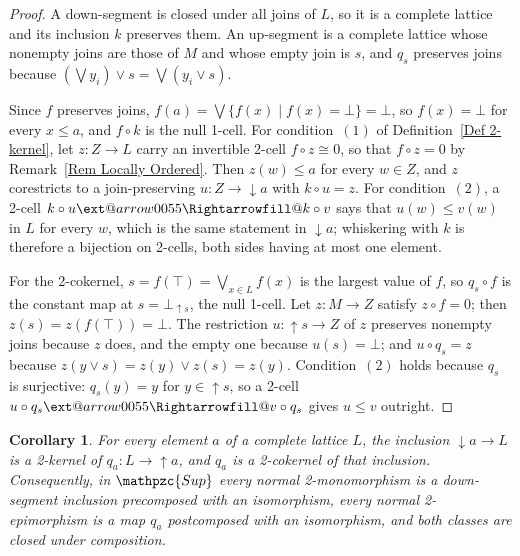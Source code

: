 \documentclass[reqno,a4paper]{amsart}
\makeatletter
\numberwithin{equation}{section}
\theoremstyle{plain}
\newtheorem{corollary}[subsection]{Corollary}
\theoremstyle{definition}
\def\nameit#1{\textrm{#1}~}
\def\defx{\nameit{Definition}}
\def\remx{\nameit{Remark}}
\newcommand{\comp}{\circ}
\newcommand{\iso}{\cong}
\newcommand{\catfont}[1]{\ensuremath{\mathpzc{#1}}\xspace}
\newcommand{\Sup}{\catfont{Sup}}
\renewcommand{\1}{\onecat{1}}
\newcommand{\dseg}[1]{\ensuremath{{\downarrow}#1}}
\newcommand{\useg}[1]{\ensuremath{{\uparrow}#1}}
\newcommand{\aR}[2][]{%
	\ext@arrow 0055{\Rightarrowfill@}{#1}{#2}}
\makeatother
\begin{document}
\begin{proof}
	A down-segment is closed under all joins of \(L\), so it is a complete lattice and its inclusion \(k\) preserves them. An up-segment is a complete lattice whose nonempty joins are those of \(M\) and whose empty join is \(s\), and \(q_{s}\) preserves joins because \((\bigvee y_{i})\vee s=\bigvee(y_{i}\vee s)\).

	Since \(f\) preserves joins, \(f(a)=\bigvee\{f(x)\mid f(x)=\bot\}=\bot\), so \(f(x)=\bot\) for every \(x\leq a\), and \(f\comp k\) is the null 1-cell. For condition~\((1)\) of \defx\ref{Def 2-kernel}, let \(z\colon Z\to L\) carry an invertible 2-cell \(f\comp z\iso 0\), so that \(f\comp z=0\) by \remx\ref{Rem Locally Ordered}. Then \(z(w)\leq a\) for every \(w\in Z\), and \(z\) corestricts to a join-preserving \(u\colon Z\to\dseg{a}\) with \(k\comp u=z\). For condition~\((2)\), a 2-cell \(k\comp u\aR{}k\comp v\) says that \(u(w)\leq v(w)\) in \(L\) for every \(w\), which is the same statement in \(\dseg{a}\); whiskering with \(k\) is therefore a bijection on 2-cells, both sides having at most one element.

	For the 2-cokernel, \(s=f(\top)=\bigvee_{x\in L}f(x)\) is the largest value of \(f\), so \(q_{s}\comp f\) is the constant map at \(s=\bot_{\useg{s}}\), the null 1-cell. Let \(z\colon M\to Z\) satisfy \(z\comp f=0\); then \(z(s)=z(f(\top))=\bot\). The restriction \(u\colon\useg{s}\to Z\) of \(z\) preserves nonempty joins because \(z\) does, and the empty one because \(u(s)=\bot\); and \(u\comp q_{s}=z\) because \(z(y\vee s)=z(y)\vee z(s)=z(y)\). Condition~\((2)\) holds because \(q_{s}\) is surjective: \(q_{s}(y)=y\) for \(y\in\useg{s}\), so a 2-cell \(u\comp q_{s}\aR{}v\comp q_{s}\) gives \(u\leq v\) outright.
\end{proof}

\begin{corollary}\label{C:SupNormal}
	For every element \(a\) of a complete lattice \(L\), the inclusion \(\dseg{a}\to L\) is a 2-kernel of \(q_{a}\colon L\to\useg{a}\), and \(q_{a}\) is a 2-cokernel of that inclusion. Consequently, in \(\Sup\) every normal 2-monomorphism is a down-segment inclusion precomposed with an isomorphism, every normal 2-epimorphism is a map \(q_{a}\) postcomposed with an isomorphism, and both classes are closed under composition.
\end{corollary}
\end{document}
